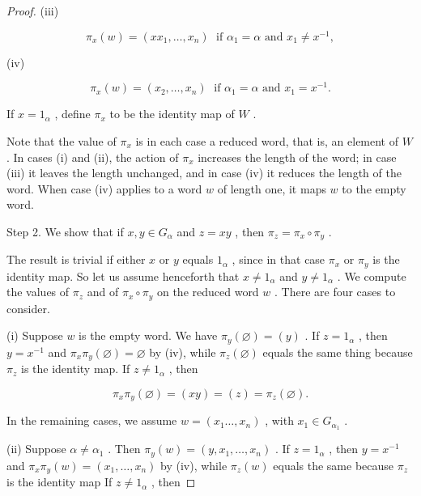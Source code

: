 \begin{proof}
(iii)

\[
{\pi }_{x}\left( w\right)  = \left( {x{x}_{1},\ldots ,{x}_{n}}\right) \;\text{ if }{\alpha }_{1} = \alpha \text{ and }{x}_{1} \neq  {x}^{-1},
\]

(iv)

\[
{\pi }_{x}\left( w\right)  = \left( {{x}_{2},\ldots ,{x}_{n}}\right) \;\text{ if }{\alpha }_{1} = \alpha \text{ and }{x}_{1} = {x}^{-1}.
\]

If \(x = {1}_{\alpha }\) , define \({\pi }_{x}\) to be the identity map of \(W\) .

Note that the value of \({\pi }_{x}\) is in each case a reduced word, that is, an element of \(W\) . In cases (i) and (ii), the action of \({\pi }_{x}\) increases the length of the word; in case (iii) it leaves the length unchanged, and in case (iv) it reduces the length of the word. When case (iv) applies to a word \(w\) of length one, it maps \(w\) to the empty word.

Step 2. We show that if \(x,y \in  {G}_{\alpha }\) and \(z = {xy}\) , then \({\pi }_{z} = {\pi }_{x} \circ  {\pi }_{y}\) .

The result is trivial if either \(x\) or \(y\) equals \({1}_{\alpha }\) , since in that case \({\pi }_{x}\) or \({\pi }_{y}\) is the identity map. So let us assume henceforth that \(x \neq  {1}_{\alpha }\) and \(y \neq  {1}_{\alpha }\) . We compute the values of \({\pi }_{z}\) and of \({\pi }_{x} \circ  {\pi }_{y}\) on the reduced word \(w\) . There are four cases to consider.

(i) Suppose \(w\) is the empty word. We have \({\pi }_{y}\left( \varnothing \right)  = \left( y\right)\) . If \(z = {1}_{\alpha }\) , then \(y = {x}^{-1}\) and \({\pi }_{x}{\pi }_{y}\left( \varnothing \right)  = \varnothing\) by (iv), while \({\pi }_{z}\left( \varnothing \right)\) equals the same thing because \({\pi }_{z}\) is the identity map. If \(z \neq  {1}_{\alpha }\) , then

\[
{\pi }_{x}{\pi }_{y}\left( \varnothing \right)  = \left( {xy}\right)  = \left( z\right)  = {\pi }_{z}\left( \varnothing \right) .
\]

In the remaining cases, we assume \(w = \left( {{x}_{1}\ldots ,{x}_{n}}\right)\) , with \({x}_{1} \in  {G}_{{\alpha }_{1}}\) .

(ii) Suppose \(\alpha  \neq  {\alpha }_{1}\) . Then \({\pi }_{y}\left( w\right)  = \left( {y,{x}_{1},\ldots ,{x}_{n}}\right)\) . If \(z = {1}_{\alpha }\) , then \(y = {x}^{-1}\) and \({\pi }_{x}{\pi }_{y}\left( w\right)  = \left( {{x}_{1},\ldots ,{x}_{n}}\right)\) by (iv), while \({\pi }_{z}\left( w\right)\) equals the same because \({\pi }_{z}\) is the identity map If \(z \neq  {1}_{\alpha }\) , then


\end{proof}
